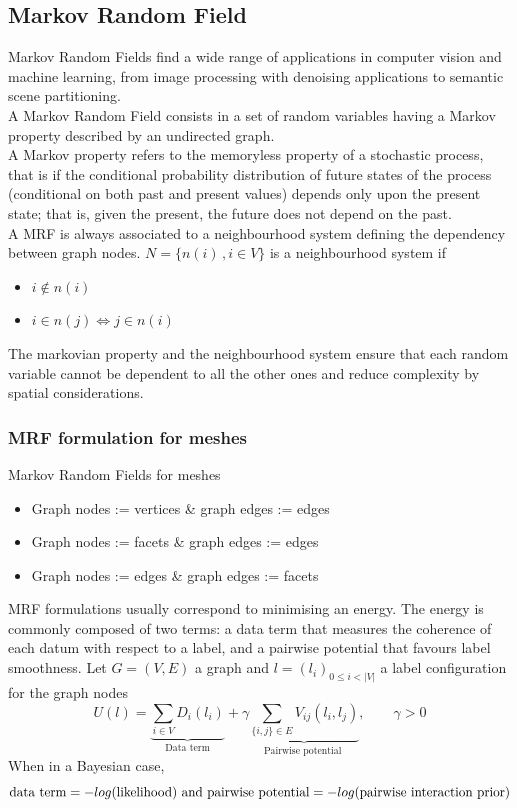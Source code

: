 \documentclass{kththesis}
\begin{document}
\subsection{Markov Random Field} 
\label{sec:MRF}
Markov Random Fields find a wide range of applications in computer vision and machine learning, from image processing with denoising applications to semantic scene partitioning. \\

A Markov Random Field  consists in a set of random variables having a Markov property described by an undirected graph. \\
A Markov property refers to the memoryless property of a stochastic process, that is if the conditional probability distribution of future states of the process (conditional on both past and present values) depends only upon the present state; that is, given the present, the future does not depend on the past. \\ 
A MRF is always associated to a neighbourhood system
defining the dependency between graph nodes.
$N= \{n(i) \,, i \in V \}$ is a neighbourhood system if
\begin{itemize}
    \item $i \notin n(i)$
    \item $i \in n(j) \Leftrightarrow j \in n(i)$
\end{itemize}

 The markovian property and the neighbourhood system ensure that each random variable cannot be dependent to all the
other ones and reduce complexity  by spatial  considerations.
\subsubsection{MRF formulation for meshes}
Markov Random Fields for meshes
\begin{itemize}
    \item Graph nodes := vertices \& graph edges := edges
    \item Graph nodes := facets \& graph edges := edges
    \item Graph nodes := edges \& graph edges := facets
\end{itemize}

MRF formulations usually correspond to minimising an energy. The energy is commonly composed of two terms: a data term that measures the coherence of each datum with respect to a label, and a pairwise potential that favours label smoothness.
Let $G=(V,E)$ a graph and $l=(l_i)_{0\leq i < |V|} $ a label configuration for the graph nodes \\
\[ U(l)=
\underbrace{ \sum \limits_{i\in V} D_i(l_i)}_{\text{Data term} } + \gamma \underbrace{ \sum \limits_{\{i,j\} \in E} V_{ij}(l_i, l_j)}_{\text{Pairwise potential }} , \qquad \gamma>0
\]
When in a Bayesian case, $$\text{data term}=-log(\text{likelihood}) \\ \text{ and pairwise potential}=-log(\text{pairwise interaction prior})$$
\end{document}
